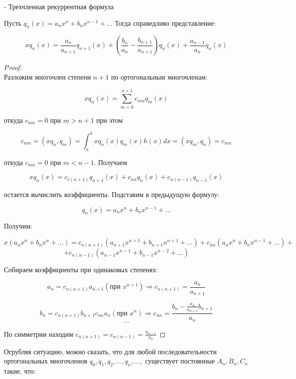 \documentclass[12pt, a4paper]{report}
\begin{document}
\fi


- Трехчленная рекуррентная формула 

Пусть \( q_n( x ) = a_n x^n + b_n x^{n -1} + ...    \) Тогда справедливо представление: 

\[ x q_n(x ) = \frac{a_n }{a_{n+1 }} q_{n+1 }  (x ) + \left( \frac{b_n }{a_n } - \frac{b_{n+1 } }{a_{n +1 } }   \right)q_n(x ) + \frac{a_{n -1 } }{a_n }q_n(x )   \] 

\begin{proof}
    \[  \] 
    Разложим многочлен степени \( n+1  \) по ортогональным многочленам: 

    \[ x q_n (x ) = \sum_{m =0 }^{n +1 } c_{n m } q_m (x ) \] 
    
    откуда \( c_{nm } = 0  \) при \( m>n +1  \) при этом 
    
    \[ c_{ nm }  = (x q_n , q_m ) = \int_{a }^{b } x q_n (x ) q_m (x ) h(x )dx = (x q_m , q_n ) = c_{mn }    \] 
    
    откуда \( c_{nm } = 0  \) при \( m < n-1  \). Получаем 
    
    \[ x q_n (x ) = c_{c ( n+1 )}   q_{ n+1 }  (x ) + c_{nn }  q_n (x ) + c_{n (n -1 )}     q_{n - 1 }  (x )  \] 
    
    остается вычислить коэффициенты. Подставим в предыдущую формулу: 
    
    \[ q_n (x  ) = a_n x^n   + b_n x^{ n -1 } +... \] 
    
    Получим: 
    
    \[ x(a_n x^n + b_n x^n + ... )= c_{n (n +1 )}  (a_{n+1 } x^{n+1 } + b_{n+1 } x^{n +1 } +...      )+ c_{nn } (a_n x^n + b_n x^{n-1}  + ... ) + \] 
    \[ +c_{n (n-1 )} (a_{n-1 } x^{n-1 } + b_{n-1} x^{n-2 } +... ) \] 
    
    Собираем коэффициенты при одинаковых степенях: 
    
    \[ a_n = c_{n (n +1 )}  a_{n+1 } (\text{при } x^{n+1 }) \Rightarrow c_{n (n+1 )}    = \frac{a_n }{a_{n+1} }   \]  
    
    \[ b_n = c_{n (n +1 )} b_{n +1 } c_{nn   } a_n (\text{при } x^n ) \Rightarrow c_{nn } = \frac{b_n -\frac{a_n }{a_{n+1}  }b_{n+1}     }{a_n}    \] 
    \[ ... \] 
    
    По симметрии находим \( \displaystyle  c_{n(n +1)}   = c_{n (n-1 )}     = \frac{a_{n- 1 } }{a_n} \) 

\end{proof}

Огрубляя ситуацию, можно сказать, что для любой последовательности ортогональных многочленов \( q_0 ,q_1 ,q_2, \ldots, q_n, \ldots,  \) существует постоянные \( A_n , B_n ,C_n  \) такие, что: 
\end{document}
